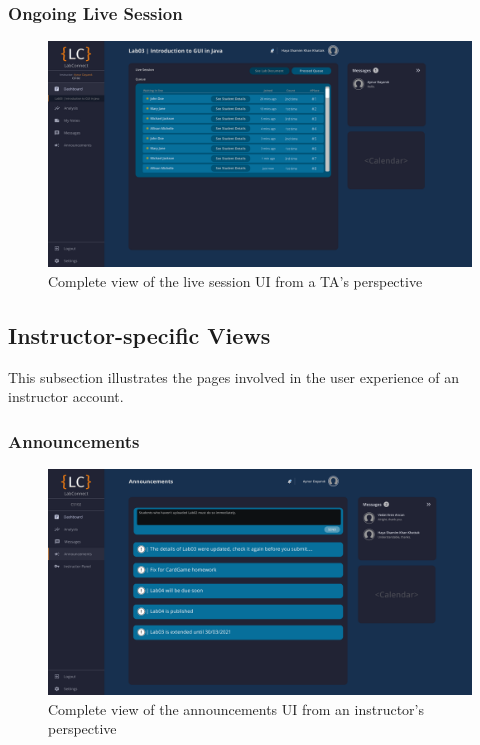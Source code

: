 \documentclass[a4paper, 12pt]{article}
\begin{document}
    \subsubsection{Ongoing Live Session}
     
    \begin{figure}[H]
        \centering
        \includegraphics[width=\textwidth]{ta_live_session}
        \caption{Complete view of the live session UI from a TA's perspective}
        \label{fig:ta_live_session_full}
    \end{figure}
    

    
    
    
    
    
    
    
    
    
    \pagebreak
    
    
    \subsection{Instructor-specific Views}
    
    This subsection illustrates the pages involved in the user experience of an instructor account.
    
    \subsubsection{Announcements}
     
    \begin{figure}[H]
        \centering
        \includegraphics[width=\textwidth]{instructor_announcements}
        \caption{Complete view of the announcements UI from an instructor's perspective}
        \label{fig:instructor_announcements_full}
    \end{figure}
        
\end{document}

